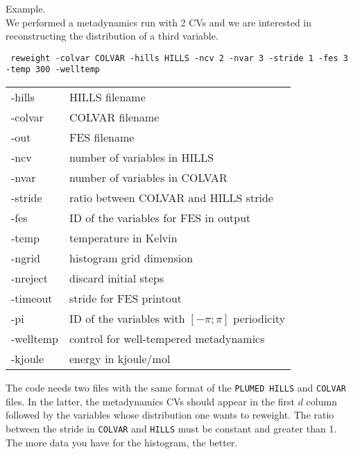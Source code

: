 \documentclass[12pt,fleqn]{report}
\newcommand{\plumed}{{\tt PLUMED}}
\newcommand{\esempio}[1]{
\vspace{10pt}
\begin{flushright}
\colorbox{light-gray}{
   \begin{minipage}{13cm}
       \scriptsize{
{\fontfamily{phv} \fontseries{b}
 \selectfont Example. \\
 \fontseries{m} \selectfont #1 } }
\end{minipage}}
\end{flushright}
\vspace{20pt}
}
\begin{document}
\esempio{We performed a metadynamics run with 2 CVs and we are interested
in reconstructing the distribution of a third variable. \vspace{0.25cm} \\

{\tt
 reweight -colvar COLVAR -hills HILLS -ncv 2 -nvar 3 -stride 1 -fes 3 -temp 300 -welltemp 
 \vspace{0.25cm} \\
   \begin{tabular}{ l l }
 -hills      & HILLS  filename \\                        
 -colvar     & COLVAR filename \\                        
 -out        & FES    filename  \\                       
 -ncv        & number of variables in HILLS \\                
 -nvar       & number of variables in COLVAR  \\              
 -stride     & ratio between COLVAR and HILLS stride\\
 -fes        & ID of the variables for FES in output \\       
 -temp       & temperature in Kelvin \\                  
 -ngrid      & histogram grid dimension \\               
 -nreject    & discard initial steps \\                
 -timeout    & stride for FES printout \\               
 -pi         & ID of the variables with $[-\pi;\pi]$ periodicity \\
 -welltemp   & control for well-tempered metadynamics \\
 -kjoule     & energy in kjoule/mol \\ 
  \end{tabular} 
}}

The code needs two files with the same format of the \plumed\ {\tt HILLS} and {\tt COLVAR} files.
In the latter, the metadynamics CVs should appear in the first $d$ column followed by the
variables whose distribution one wants to reweight. The ratio between the stride in {\tt COLVAR}
and {\tt HILLS} must be constant and greater than 1. The more data you have for the histogram, the better.
\end{document}
